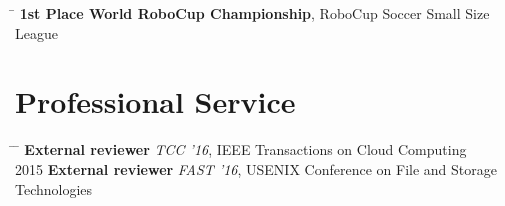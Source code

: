 \documentclass[10pt]{article} %
\begin{document}
\begin{tabbing}
\hspace{2.5cm} \=  \> \textbf{1st Place World RoboCup Championship}, RoboCup Soccer Small Size League
\end{tabbing}




\section{Professional Service}

\begin{tabbing}
\hspace{2.5cm} \= \hspace{3.5cm}  \=  \> \textbf{External reviewer} \> \textit{TCC '16}, IEEE Transactions on Cloud Computing \\
2015 \> \textbf{External reviewer} \> \textit{FAST '16}, USENIX Conference on File and Storage Technologies
\end{tabbing}


%
\end{document}
